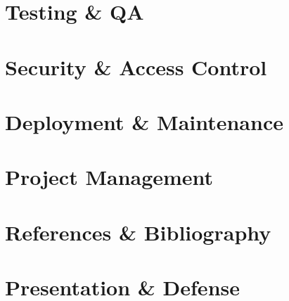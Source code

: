\documentclass[11pt,a4paper]{report}
\begin{document}
\chapter{Testing \& QA}
\label{sec:3-9}



\chapter{Security \& Access Control}
\label{sec:3-10}



\chapter{Deployment \& Maintenance}
\label{sec:3-11}



\chapter{Project Management}
\label{sec:3-12}



\chapter{References \& Bibliography}
\label{sec:3-13}



\chapter{Presentation \& Defense}
\label{sec:3-14}
\end{document}
